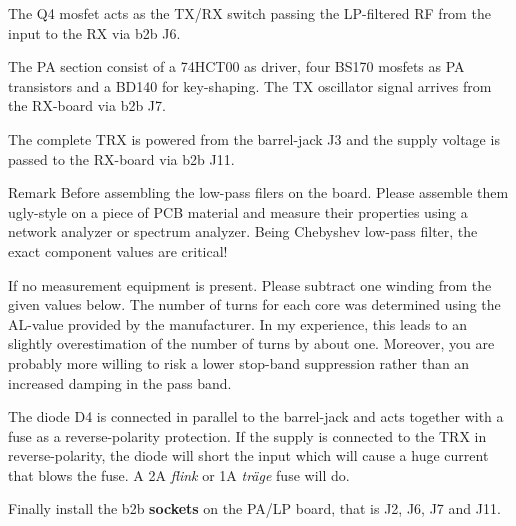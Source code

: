\documentclass[10pt, a4paper]{scrartcl}
\newenvironment{remark}{\begin{bclogo}[couleur=blue!30,arrondi=.1,logo=\bcinfo,ombre=true]{Remark}}{\end{bclogo}}
\begin{document}
The Q4 mosfet acts as the TX/RX switch passing the LP-filtered RF from the input to the RX via b2b J6.

The PA section consist of a 74HCT00 as driver, four BS170 mosfets as PA transistors and a BD140 for key-shaping. The TX oscillator signal arrives from the RX-board via b2b J7.

The complete TRX is powered from the barrel-jack J3 and the supply voltage is passed to the RX-board via b2b J11. 

\begin{remark}
 Before assembling the low-pass filers on the board. Please assemble them ugly-style on a piece of PCB material and measure their properties using a network analyzer or spectrum analyzer. Being Chebyshev low-pass filter, the exact component values are critical!
\end{remark}

 If no measurement equipment is present. Please subtract one winding from the given values below. The number of turns for each core was determined using the AL-value provided by the manufacturer. In my experience, this leads to an slightly overestimation of the number of turns by about one. Moreover, you are probably more willing to risk a lower stop-band suppression rather than an increased damping in the pass band.
 
 The diode D4 is connected in parallel to the barrel-jack and acts together with a fuse as a reverse-polarity protection. If the supply is connected to the TRX in reverse-polarity, the diode will short the input which will cause a huge current that blows the fuse. A 2A \emph{flink} or 1A \emph{träge} fuse will do.
 
 Finally install the b2b \textbf{sockets} on the PA/LP board, that is J2, J6, J7 and J11.
 
\end{document}
